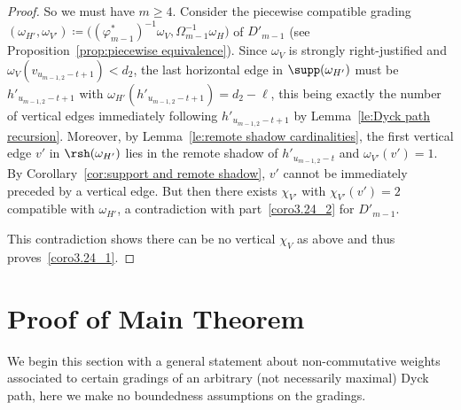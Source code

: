 \begin{proof}
 So we must have $m\ge4$.
 Consider the piecewise compatible grading $(\omega_{H'},\omega_{V'})\coloneqq \big((\varphi^*_{m-1})^{-1}\omega_V,\Omega_{m-1}^{-1}\omega_H\big)$ of $D'_{m-1}$ (see Proposition~\ref{prop:piecewise equivalence}).
 Since $\omega_V$ is strongly right-justified and $\omega_V(v_{u_{m-1,2}-t+1})<d_2$, the last horizontal edge in $\supp(\omega_{H'})$ must be $h'_{u_{m-1,2}-t+1}$ with $\omega_{H'}(h'_{u_{m-1,2}-t+1})=d_2-\ell$, this being exactly the number of vertical edges immediately following $h'_{u_{m-1,2}-t+1}$ by Lemma~\ref{le:Dyck path recursion}.
 Moreover, by Lemma~\ref{le:remote shadow cardinalities}, the first vertical edge $v'$ in $\rsh(\omega_{H'})$ lies in the remote shadow of $h'_{u_{m-1,2}-t}$ and $\omega_{V'}(v')=1$.
 By Corollary~\ref{cor:support and remote shadow}, $v'$ cannot be immediately preceded by a vertical edge.
 But then there exists $\chi_{V'}$ with $\chi_{V'}(v')=2$ compatible with $\omega_{H'}$, a contradiction with part~\ref{coro3.24_2} for $D'_{m-1}$.
 
 This contradiction shows there can be no vertical $\chi_V$ as above and thus proves~\ref{coro3.24_1}.
\end{proof}


\section{Proof of Main Theorem}
\label{sec:proof of main}

\noindent
We begin this section with a general statement about non-commutative weights associated to certain gradings of an arbitrary (\ie not necessarily maximal) Dyck path, here we make no boundedness assumptions on the gradings.

